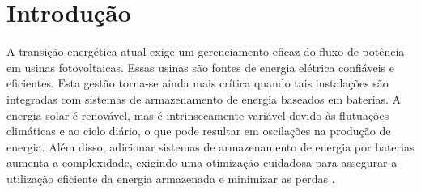 

\chapter{Introdução}
\label{c_introducao}






A transição energética atual exige um gerenciamento eficaz do fluxo de potência em usinas fotovoltaicas. Essas usinas são fontes de energia elétrica confiáveis e eficientes. Esta gestão torna-se ainda mais crítica quando tais instalações são integradas com sistemas de armazenamento de energia baseados em baterias. A energia solar é renovável, mas é intrinsecamente variável devido às flutuações climáticas e ao ciclo diário, o que pode resultar em oscilações na produção de energia. Além disso, adicionar sistemas de armazenamento de energia por baterias aumenta a complexidade, exigindo uma otimização cuidadosa para assegurar a utilização eficiente da energia armazenada e minimizar as perdas \cite{bueno2013}.

